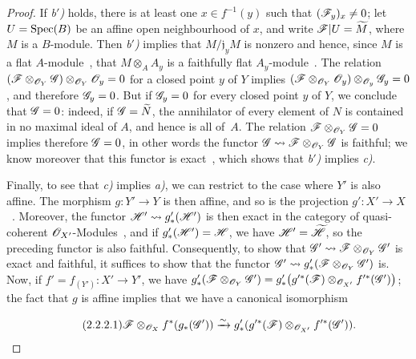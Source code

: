 \begin{proof}
If \emph{b$'$)} holds, there is at least one $x\in f^{-1}(y)$ such that $(\mathscr{F}_y)_x\neq 0$; let $U=\operatorname{Spec}(B)$ be an affine open neighbourhood of $x$, and write $\mathscr{F}|U=\widetilde{M}$, where $M$ is a $B$-module.
Then \emph{b$'$)} implies that $M/\mathfrak{j}_yM$ is nonzero and hence, since $M$ is a flat $A$-module~, that $M\otimes_A A_y$ is a faithfully flat $A_y$-module~.
The relation $(\mathscr{F}\otimes_{\mathscr{O}_Y}\mathscr{G})\otimes_{\mathscr{O}_Y}\mathscr{O}_y=0$ for a closed point $y$ of $Y$ implies $(\mathscr{F}\otimes_{\mathscr{O}_Y}\mathscr{O}_y)\otimes_{\mathscr{O}_y}\mathscr{G}_y=0$,
and therefore $\mathscr{G}_y=0$.
But if $\mathscr{G}_y=0$ for every closed point $y$ of $Y$, we conclude that $\mathscr{G}=0$: indeed, if $\mathscr{G}=\widetilde{N}$, the annihilator of every element of $N$ is contained in no maximal ideal of $A$, and hence is all of~$A$.
The relation $\mathscr{F}\otimes_{\mathscr{O}_Y}\mathscr{G}=0$ implies therefore $\mathscr{G}=0$, in other words the functor $\mathscr{G}\leadsto\mathscr{F}\otimes_{\mathscr{O}_Y}\mathscr{G}$ is faithful; we know moreover that this functor is exact~, which shows that \emph{b$'$)} implies \emph{c)}.

Finally, to see that \emph{c)} implies \emph{a)}, we can restrict to the case where $Y'$ is also affine.
The morphism $g:Y'\to Y$ is then affine, and so is the projection $g':X'\to X$~.
Moreover, the functor $\mathscr{H}'\leadsto g'_*(\mathscr{H}')$ is then exact in the category of quasi-coherent $\mathscr{O}_{X'}$-Modules~, and if $g'_*(\mathscr{H}')=\mathscr{H}$, we have $\mathscr{H}'=\widetilde{\mathscr{H}}$, so the preceding functor is also faithful.
Consequently, to show that $\mathscr{G}'\leadsto\mathscr{F}\otimes_{\mathscr{O}_Y}\mathscr{G}'$ is exact and faithful, it suffices to show that the functor $\mathscr{G}'\leadsto g'_*(\mathscr{F}\otimes_{\mathscr{O}_Y}\mathscr{G}')$ is.
Now, if $f'=f_{(Y')}:X'\to Y'$, we have $g'_*(\mathscr{F}\otimes_{\mathscr{O}_Y}\mathscr{G}')=g'_*\bigl(g'^*(\mathscr{F})\otimes_{\mathscr{O}_{X'}}f'^*(\mathscr{G}')\bigr)$; the fact that $g$ is affine implies that we have a canonical isomorphism

\begin{equation}
\tag{2.2.2.1}
\label{IV.2.2.2.1}
  \mathscr{F}\otimes_{\mathscr{O}_X}f^*(g_*(\mathscr{G}'))\xrightarrow{\sim} g'_*(g'^*(\mathscr{F})\otimes_{\mathscr{O}_{X'}}f'^*(\mathscr{G}')).
\end{equation}


\end{proof}
